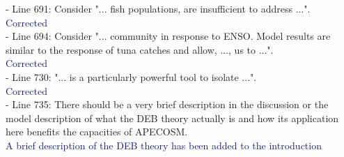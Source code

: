 \documentclass[12pt]{article}
\newcommand{\resp}[1]{\textcolor{MidnightBlue}{#1}}
\begin{document}
- Line 691: Consider "... fish populations, are insufficient to address ...".\\

\resp{Corrected}  \\

- Line 694: Consider "... community in response to ENSO. Model results are similar to the response of tuna catches and allow, ..., us to ...".\\

\resp{Corrected} \\

- Line 730: "... is a particularly powerful tool to isolate ...".\\

\resp{Corrected} \\

- Line 735: There should be a very brief description in the discussion or the model description of what the DEB theory actually is and how its application here benefits the capacities of APECOSM.\\

\resp{A brief description of the DEB theory has been added to the introduction}


\end{document}
